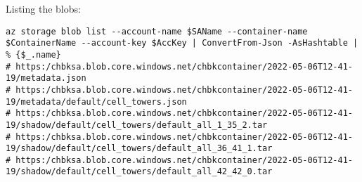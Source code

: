 Listing the blobs:
\begin{verbatim}
az storage blob list --account-name $SAName --container-name $ContainerName --account-key $AccKey | ConvertFrom-Json -AsHashtable | % {$_.name}
# https:/chbksa.blob.core.windows.net/chbkcontainer/2022-05-06T12-41-19/metadata.json
# https:/chbksa.blob.core.windows.net/chbkcontainer/2022-05-06T12-41-19/metadata/default/cell_towers.json
# https:/chbksa.blob.core.windows.net/chbkcontainer/2022-05-06T12-41-19/shadow/default/cell_towers/default_all_1_35_2.tar
# https:/chbksa.blob.core.windows.net/chbkcontainer/2022-05-06T12-41-19/shadow/default/cell_towers/default_all_36_41_1.tar
# https:/chbksa.blob.core.windows.net/chbkcontainer/2022-05-06T12-41-19/shadow/default/cell_towers/default_all_42_42_0.tar
\end{verbatim}
